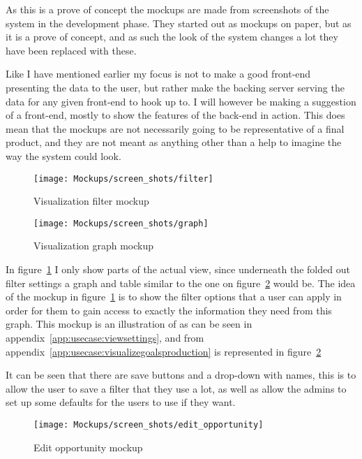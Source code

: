 As this is a prove of concept the mockups are made from screenshots of the
system in the development phase. They started out as mockups on paper, but as it
is a prove of concept, and as such the look of the system changes a lot they
have been replaced with these.

Like I have mentioned earlier my focus is not to make a good front-end presenting
the data to the user, but rather make the backing server serving the data for
any given front-end to hook up to. I will however be making a suggestion of a
front-end, mostly to show the features of the back-end in action. This does
 mean that the mockups are not necessarily going to be representative of
a final product, and they are not meant as anything other than a help to
imagine the way the system could look. 

\begin{figure}[!htb]
  \centering
  \texttt{[image: Mockups/screen\_shots/filter]}
  \caption{Visualization filter mockup}
  \label{fig:VisualizationFilter}
\end{figure}

\begin{figure}[!htb]
  \centering
  \texttt{[image: Mockups/screen\_shots/graph]}
  \caption{Visualization graph mockup}
  \label{fig:VisualizationView}
\end{figure}

In figure~\ref{fig:VisualizationFilter} I only show parts  of the actual view,
since underneath the folded out filter settings a graph and table similar to the
one on figure~\ref{fig:VisualizationView} would be. The idea of the mockup in
figure~\ref{fig:VisualizationFilter} is to show the filter options that a user
can apply in order for them to gain access to exactly the information they need
from this graph. This mockup is an illustration of
 as can be seen in
appendix~\ref{app:usecase:viewsettings}, and
 from
appendix~\ref{app:usecase:visualizegoalsproduction} is represented in figure~\ref{fig:VisualizationView}

It can be seen that there are save buttons and a drop-down with names, this is to
allow the user to save a filter that they use a lot, as well as allow the admins
to set up some defaults for the users to use if they want.

\begin{figure}[!htb]
  \centering
  \texttt{[image: Mockups/screen\_shots/edit\_opportunity]}
  \caption{Edit opportunity mockup}
  \label{fig:OpportunityView}
\end{figure}

